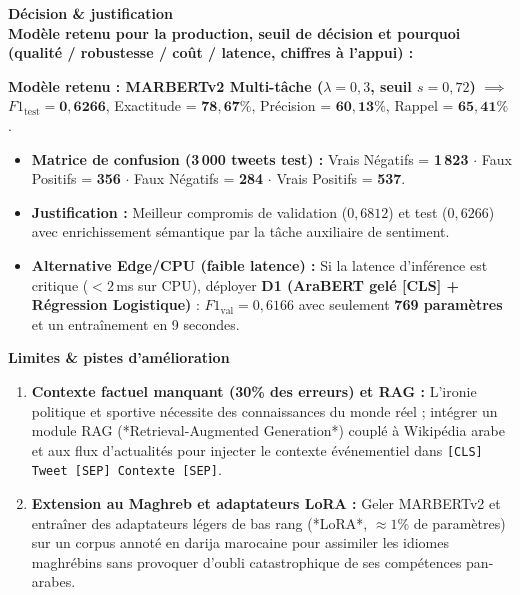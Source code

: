 \documentclass[10pt,a4paper]{article}
\begin{document}
\vspace{-2pt}
\noindent\textbf{\large Décision \& justification}\\[1pt]
\noindent\textbf{Modèle retenu pour la production, seuil de décision et pourquoi (qualité / robustesse / coût / latence, chiffres à l'appui) :}
\begin{tcolorbox}[reponsebox]
  \textbf{Modèle retenu : MARBERTv2 Multi-tâche ($\lambda=0{,}3$, seuil $s=0{,}72$)} $\implies$ $F1_{\text{test}} = \mathbf{0{,}6266}$, Exactitude = $\mathbf{78{,}67\%}$, Précision = $\mathbf{60{,}13\%}$, Rappel = $\mathbf{65{,}41\%}$.
  \begin{itemize}
    \item \textbf{Matrice de confusion (3\,000 tweets test) :} Vrais Négatifs = \textbf{1\,823} $\cdot$ Faux Positifs = \textbf{356} $\cdot$ Faux Négatifs = \textbf{284} $\cdot$ Vrais Positifs = \textbf{537}.
    \item \textbf{Justification :} Meilleur compromis de validation ($0{,}6812$) et test ($0{,}6266$) avec enrichissement sémantique par la tâche auxiliaire de sentiment.
    \item \textbf{Alternative Edge/CPU (faible latence) :} Si la latence d'inférence est critique ($<2$\,ms sur CPU), déployer \textbf{D1 (AraBERT gelé [CLS] + Régression Logistique)} : $F1_{\text{val}} = 0{,}6166$ avec seulement \textbf{769 paramètres} et un entraînement en 9 secondes.
  \end{itemize}
\end{tcolorbox}

\vspace{-2pt}
\noindent\textbf{\large Limites \& pistes d'amélioration}
\begin{tcolorbox}[reponsebox]
  \begin{enumerate}
    \item \textbf{Contexte factuel manquant (30\% des erreurs) et RAG :} L'ironie politique et sportive nécessite des connaissances du monde réel ; intégrer un module RAG (*Retrieval-Augmented Generation*) couplé à Wikipédia arabe et aux flux d'actualités pour injecter le contexte événementiel dans \texttt{[CLS] Tweet [SEP] Contexte [SEP]}.
    \item \textbf{Extension au Maghreb et adaptateurs LoRA :} Geler MARBERTv2 et entraîner des adaptateurs légers de bas rang (*LoRA*, $\approx 1\%$ de paramètres) sur un corpus annoté en darija marocaine pour assimiler les idiomes maghrébins sans provoquer d'oubli catastrophique de ses compétences pan-arabes.
  \end{enumerate}
\end{tcolorbox}
\end{document}
